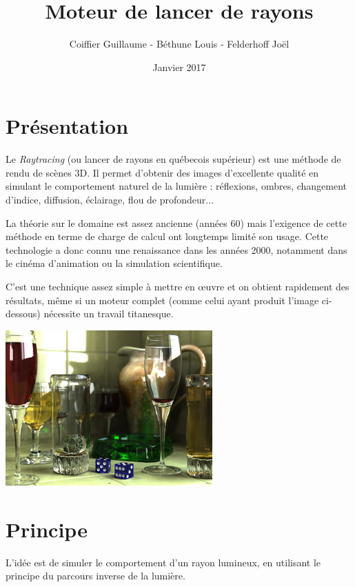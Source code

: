 \documentclass[a4paper, 11pt]{article}
\begin{document}
\title{Moteur de lancer de rayons}
\author{Coiffier Guillaume - Béthune Louis - Felderhoff Joël}
\date{Janvier 2017} 

\maketitle

\section*{Présentation}
 
Le \textit{Raytracing} (ou lancer de rayons en québecois supérieur) est une méthode de rendu de scènes 3D. Il permet d'obtenir des images d'excellente qualité en simulant le comportement naturel de la lumière : réflexions, ombres, changement d'indice, diffusion, éclairage, flou de profondeur... 
  
La théorie sur le domaine est assez ancienne (années 60) mais l'exigence de cette méthode en terme de charge de calcul ont longtemps limité son usage. Cette technologie a donc connu une renaissance dans les années 2000, notamment dans le cinéma d'animation ou la simulation scientifique.  
  
C'est une technique assez simple à mettre en œuvre et on obtient rapidement des résultats, même si un moteur complet (comme celui ayant produit l'image ci-dessous) nécessite un travail titanesque.

\begin{center}
\includegraphics[scale=1]{300px-Glasses_800_edit.png}
\end{center}
\newpage

\section{Principe}
L'idée est de simuler le comportement d'un rayon lumineux, en utilisant le principe du parcours inverse de la lumière.  
  
\end{document}

